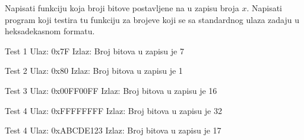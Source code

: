 \begin{Exercise}[label=202]
 Napisati funkciju koja broji bitove postavljene na  u zapisu broja $x$. Napisati program koji testira tu funkciju za brojeve koji se sa standardnog ulaza zadaju u heksadekasnom formatu.

\begin{minitest}
\begin{test}{Test 1}
Ulaz:   0x7F  
Izlaz:  
  Broj bitova u zapisu je  7   
\end{test}
\end{minitest}
\begin{minitest}
\begin{test}{Test 2}
Ulaz:   0x80
Izlaz:  
  Broj bitova u zapisu je 1
\end{test}
\end{minitest}
\begin{minitest}
\begin{test}{Test 3}
Ulaz:   0x00FF00FF
Izlaz:  
  Broj bitova u zapisu je 16
\end{test}
\end{minitest}

\begin{minitest}
\begin{test}{Test 4}
Ulaz:   0xFFFFFFFF
Izlaz:  
  Broj bitova u zapisu je 32
\end{test}
\end{minitest}
\begin{minitest}
\begin{test}{Test 4}
Ulaz:   0xABCDE123
Izlaz:  
  Broj bitova u zapisu je 17
\end{test}
\end{minitest}

\end{Exercise}
\begin{Answer}[ref=202]
\end{Answer}


